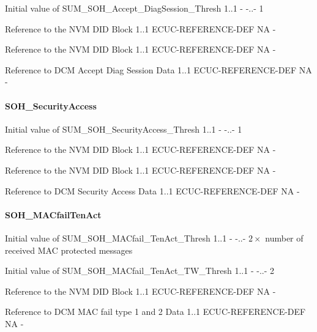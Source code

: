 {{{{{{{{{{{{{{
{Initial value of SUM_SOH_Accept_DiagSession_Thresh}
{1..1}
{-}
{-..-}
{1}}

{
{Reference to the NVM DID Block}
{1..1}
{ECUC-REFERENCE-DEF}
{NA}
{-}}

{
{Reference to the NVM DID Block}
{1..1}
{ECUC-REFERENCE-DEF}
{NA}
{-}}

{
{Reference to DCM Accept Diag Session Data}
{1..1}
{ECUC-REFERENCE-DEF}
{NA}
{-}}

\paragraph{SOH_SecurityAccess}

{
{Initial value of SUM_SOH_SecurityAccess_Thresh}
{1..1}
{-}
{-..-}
{1}}

{
{Reference to the NVM DID Block}
{1..1}
{ECUC-REFERENCE-DEF}
{NA}
{-}}

{
{Reference to the NVM DID Block}
{1..1}
{ECUC-REFERENCE-DEF}
{NA}
{-}}

{
{Reference to DCM Security Access Data}
{1..1}
{ECUC-REFERENCE-DEF}
{NA}
{-}}

\paragraph{SOH_MACfailTenAct}

{
{Initial value of SUM_SOH_MACfail_TenAct_Thresh}
{1..1}
{-}
{-..-}
{$2\times$ number of received MAC protected messages}}

{
{Initial value of SUM_SOH_MACfail_TenAct_TW_Thresh}
{1..1}
{-}
{-..-}
{2}}

{
{Reference to the NVM DID Block}
{1..1}
{ECUC-REFERENCE-DEF}
{NA}
{-}}

{
{Reference to DCM MAC fail type 1 and 2 Data}
{1..1}
{ECUC-REFERENCE-DEF}
{NA}
{-}}

}}}}}}}}}}}}}
